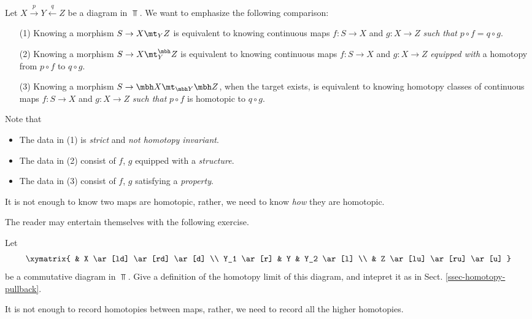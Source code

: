 \ssec{}
\label{ssec-homotopy-pullback}

Let $X \xrightarrow{p} Y \xleftarrow{q} Z$ be a diagram in $\Top$. We want to emphasize the following comparison:
\begin{itemize}
	\item[(1)] 
		Knowing a morphism $S\to X\mt_Y Z$ is equivalent to knowing continuous maps $f:S \to X$ and $g:X \to Z$ \emph{such that} $p\circ f = q\circ g$.
	\item[(2)]
		Knowing a morphism $S\to X\mt^\mbh_Y Z$ is equivalent to knowing continuous maps $f:S \to X$ and $g:X \to Z$ \emph{equipped with} a homotopy from $p\circ f$ to $q\circ g$.
	\item[(3)]
		Knowing a morphism $S \to \mbh X\mt_{\mbh Y} \mbh Z$, when the target exists, is equivalent to knowing homotopy classes of continuous maps $f:S \to X$ and $g:X \to Z$ \emph{such that} $p\circ f$ is homotopic to $q\circ g$.
\end{itemize}

Note that
\begin{itemize}
	\item
		The data in (1) is \emph{strict} and \emph{not homotopy invariant}.
	\item
		The data in (2) consist of $f$, $g$ equipped with a \emph{structure}.
	\item
		The data in (3) consist of $f$, $g$ satisfying a \emph{property}.
\end{itemize}

\begin{slog}
	It is not enough to know two maps are homotopic, rather, we need to know \emph{how} they are homotopic.
\end{slog}

\ssec{}

The reader may entertain themselves with the following exercise.

\begin{exe}
	Let 
	\[
		\xymatrix{
			& X \ar[ld] \ar[rd] \ar[d] \\
			Y_1 \ar[r] & Y & Y_2 \ar[l] \\
			& Z \ar[lu] \ar[ru] \ar[u]
		}
	\]
	be a commutative diagram in $\Top$. Give a definition of the homotopy limit of this diagram, and intepret it as in Sect. \ref{ssec-homotopy-pullback}.
\end{exe}

\begin{slog}
	It is not enough to record homotopies between maps, rather, we need to record all the higher homotopies.
\end{slog}








